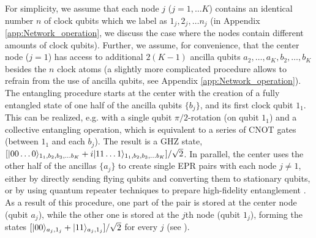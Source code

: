 For simplicity, we assume that each node $j$ ($j=1,\dots K$) contains an
identical number $n$ of clock qubits which we label as $1_j, 2_j,\dots n_j$ (in
Appendix \ref{app:Network_operation}, we discuss the case where the nodes contain
different amounts of clock qubits).
Further, we assume, for convenience, that the center node ($j=1$) has access to
additional $2(K-1)$ ancilla qubits $a_2,\dots, a_K,b_2,\dots,b_K$ besides the
$n$ clock atoms (a slightly more complicated procedure allows to refrain from
the use of ancilla qubits, see Appendix \ref{app:Network_operation}).
The entangling procedure starts at the center with the creation of a fully
entangled state of one half of the ancilla qubits $\{b_j\}$, and its first clock
qubit $1_1$. 
This can be realized, e.g.  with a single qubit $\pi/2$-rotation
(on qubit $1_1$)
and a collective entangling operation, which is equivalent to a series of
CNOT gates \cite{Nielsen_Chuang} (between $1_1$ and each $b_j$).
The result is a GHZ state, $[| 00\dots 0 \rangle_{1_1,b_2,b_3,\dots b_K} +
i| 11\dots 1 \rangle_{1_1,b_2,b_3,\dots b_K}]/\sqrt{2}$.
In parallel, the center uses the other half of the ancillas $\{a_j\}$ to create single EPR pairs with each node $j\neq1$,
either by directly sending flying qubits and converting them to stationary
qubits, or by using quantum repeater techniques to prepare high-fidelity entanglement \cite{duan3}. As a result of this procedure, 
one part of the pair is stored at the center node (qubit $a_j$), while the other one
is stored at the $j$th  node (qubit $1_j$), forming the states $[| 00 \rangle_{a_j,1_j} +
| 11 \rangle_{a_j,1_j}]/\sqrt{2}$ for every $j$ (see ).
